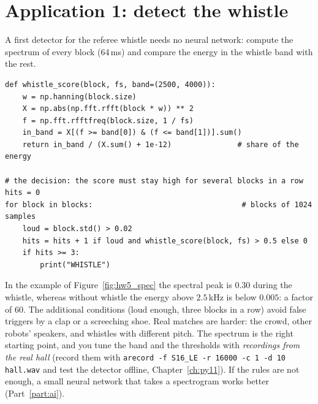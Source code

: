 \section*{Application 1: detect the whistle}
A first detector for the referee whistle needs no neural network: compute the spectrum of every block ($64$\,ms) and compare the energy in the whistle band with the rest.
\begin{verbatim}
def whistle_score(block, fs, band=(2500, 4000)):
    w = np.hanning(block.size)
    X = np.abs(np.fft.rfft(block * w)) ** 2
    f = np.fft.rfftfreq(block.size, 1 / fs)
    in_band = X[(f >= band[0]) & (f <= band[1])].sum()
    return in_band / (X.sum() + 1e-12)               # share of the energy

# the decision: the score must stay high for several blocks in a row
hits = 0
for block in blocks:                                  # blocks of 1024 samples
    loud = block.std() > 0.02
    hits = hits + 1 if loud and whistle_score(block, fs) > 0.5 else 0
    if hits >= 3:
        print("WHISTLE")
\end{verbatim}
In the example of Figure~\ref{fig:hw5_spec} the spectral peak is $0.30$ during the whistle, whereas without whistle the energy above $2.5$\,kHz is below $0.005$: a factor of $60$. The additional conditions (loud enough, three blocks in a row) avoid false triggers by a clap or a screeching shoe. Real matches are harder: the crowd, other robots' speakers, and whistles with different pitch. The spectrum is the right starting point, and you tune the band and the thresholds with \emph{recordings from the real hall} (record them with \verb!arecord -f S16_LE -r 16000 -c 1 -d 10 hall.wav! and test the detector offline, Chapter~\ref{ch:py11}). If the rules are not enough, a small neural network that takes a spectrogram works better (Part~\ref{part:ai}).

